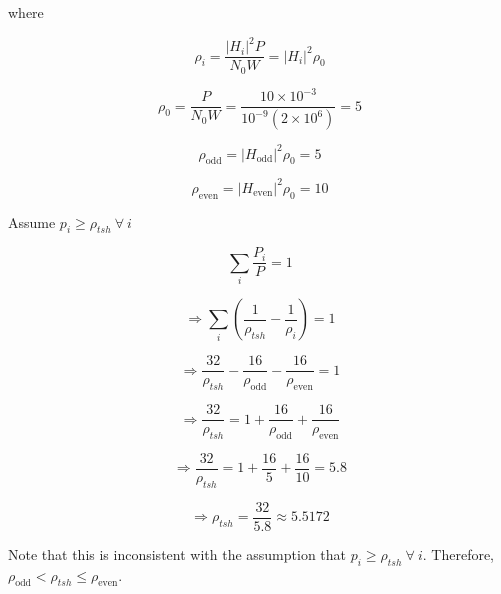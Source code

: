 \documentclass[fleqn]{article}
\begin{document}
\begin{enumerate}
		where
		
		\begin{equation*}
			\rho_i = \frac{|H_i|^2P}{N_0W} = |H_i|^2\rho_0 
		\end{equation*}
		
		\begin{equation*}
			\rho_0 = \frac{P}{N_0W} = \frac{10 \times 10^{-3}}{10^{-9}(2 \times 10^6)} = 5
		\end{equation*}
		
		\begin{equation*}
			\rho_{\text{odd}} = |H_{\text{odd}}|^2\rho_0 = 5
		\end{equation*}
		
		\begin{equation*}
			\rho_{\text{even}} = |H_{\text{even}}|^2\rho_0 = 10
		\end{equation*}
		
		Assume $p_i \geq \rho_{tsh}\ \forall\ i$
		
		\begin{equation*}
			\sum_i{\frac{P_i}{P}} = 1
		\end{equation*}
		
		\begin{equation*}
			\Rightarrow \sum_i{\left(\frac{1}{\rho_{tsh}} - \frac{1}{\rho_i}\right)} = 1
		\end{equation*}
		
		\begin{equation*}
			\Rightarrow \frac{32}{\rho_{tsh}} - \frac{16}{\rho_{\text{odd}}} - \frac{16}{\rho_{\text{even}}} = 1
		\end{equation*}
		
		\begin{equation*}
			\Rightarrow \frac{32}{\rho_{tsh}} = 1 + \frac{16}{\rho_{\text{odd}}} + \frac{16}{\rho_{\text{even}}}
		\end{equation*}
		
		\begin{equation*}
			\Rightarrow \frac{32}{\rho_{tsh}} = 1 + \frac{16}{5} + \frac{16}{10} = 5.8
		\end{equation*}
		
		\begin{equation*}
			\Rightarrow \rho_{tsh} = \frac{32}{5.8} \approx 5.5172
		\end{equation*}
		
		Note that this is inconsistent with the assumption that $p_i \geq \rho_{tsh}\ \forall\ i$. Therefore, $\rho_{\text{odd}} < \rho_{tsh} \leq \rho_{\text{even}}$.
		

\end{enumerate}
\end{document}
